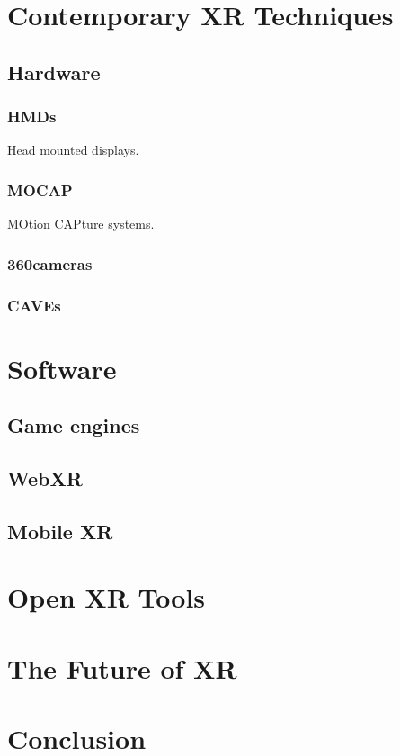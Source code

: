 \section{Contemporary XR Techniques}

\subsection{Hardware}
\subsubsection{HMDs}
Head mounted displays.

\subsubsection{MOCAP}
MOtion CAPture systems. 

\subsubsection{360\textdegree cameras}

\subsubsection{CAVEs}


\section{Software}
\subsection{Game engines}
\subsection{WebXR}
\subsection{Mobile XR}
\section{Open XR Tools }
\section{The Future of XR}
\section{Conclusion}



